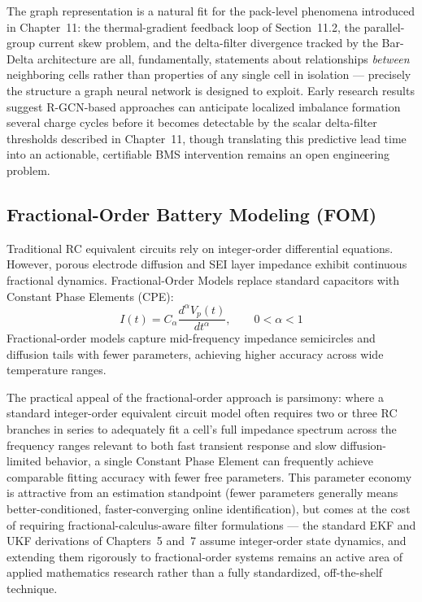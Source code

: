 The graph representation is a natural fit for the pack-level phenomena introduced in Chapter~11: the thermal-gradient feedback loop of Section~11.2, the parallel-group current skew problem, and the delta-filter divergence tracked by the Bar-Delta architecture are all, fundamentally, statements about relationships \emph{between} neighboring cells rather than properties of any single cell in isolation — precisely the structure a graph neural network is designed to exploit. Early research results suggest R-GCN-based approaches can anticipate localized imbalance formation several charge cycles before it becomes detectable by the scalar delta-filter thresholds described in Chapter~11, though translating this predictive lead time into an actionable, certifiable BMS intervention remains an open engineering problem.

\subsection{Fractional-Order Battery Modeling (FOM)}
\label{subsec:14_fom}

Traditional RC equivalent circuits rely on integer-order differential equations. However, porous electrode diffusion and SEI layer impedance exhibit continuous fractional dynamics. Fractional-Order Models replace standard capacitors with Constant Phase Elements (CPE):
\begin{equation}
I(t) = C_\alpha \frac{d^\alpha V_p(t)}{d t^\alpha}, \qquad 0 < \alpha < 1
\end{equation}
Fractional-order models capture mid-frequency impedance semicircles and diffusion tails with fewer parameters, achieving higher accuracy across wide temperature ranges.

The practical appeal of the fractional-order approach is parsimony: where a standard integer-order equivalent circuit model often requires two or three RC branches in series to adequately fit a cell's full impedance spectrum across the frequency ranges relevant to both fast transient response and slow diffusion-limited behavior, a single Constant Phase Element can frequently achieve comparable fitting accuracy with fewer free parameters. This parameter economy is attractive from an estimation standpoint (fewer parameters generally means better-conditioned, faster-converging online identification), but comes at the cost of requiring fractional-calculus-aware filter formulations — the standard EKF and UKF derivations of Chapters~5 and~7 assume integer-order state dynamics, and extending them rigorously to fractional-order systems remains an active area of applied mathematics research rather than a fully standardized, off-the-shelf technique.

